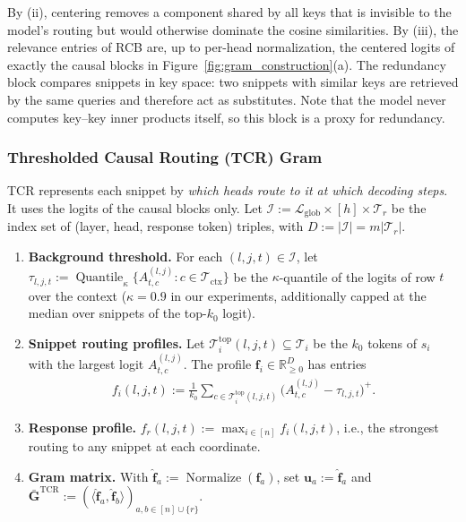 \documentclass{article}
\begin{document}
By (ii), centering removes a component shared by all keys that is invisible to the model's routing but would otherwise dominate the cosine similarities. By (iii), the relevance entries of RCB are, up to per-head normalization, the centered logits of exactly the causal blocks in Figure~\ref{fig:gram_construction}(a). The redundancy block compares snippets in key space: two snippets with similar keys are retrieved by the same queries and therefore act as substitutes. Note that the model never computes key--key inner products itself, so this block is a proxy for redundancy.

\subsubsection{Thresholded Causal Routing (TCR) Gram}
\label{subsubsec:tcr}

TCR represents each snippet by \emph{which heads route to it at which decoding steps}. It uses the logits of the causal blocks only. Let $\mathcal{I} := \mathcal{L}_{\text{glob}} \times [h] \times \mathcal{T}_r$ be the index set of (layer, head, response token) triples, with $D := |\mathcal{I}| = m |\mathcal{T}_r|$.

\begin{enumerate}
    \item \textbf{Background threshold.} For each $(l,j,t) \in \mathcal{I}$, let $\tau_{l,j,t} := \operatorname{Quantile}_\kappa\{A^{(l,j)}_{t,c} : c \in \mathcal{T}_{\text{ctx}}\}$ be the $\kappa$-quantile of the logits of row $t$ over the context ($\kappa = 0.9$ in our experiments, additionally capped at the median over snippets of the top-$k_0$ logit).
    \item \textbf{Snippet routing profiles.} Let $\mathcal{T}_i^{\text{top}}(l,j,t) \subseteq \mathcal{T}_i$ be the $k_0$ tokens of $s_i$ with the largest logit $A^{(l,j)}_{t,c}$. The profile $\mathbf{f}_i \in \mathbb{R}_{\ge 0}^{D}$ has entries
    \begin{align}
        f_i(l,j,t) := \frac{1}{k_0} \sum_{c \in \mathcal{T}_i^{\text{top}}(l,j,t)} \big( A^{(l,j)}_{t,c} - \tau_{l,j,t} \big)^+.
    \end{align}
    \item \textbf{Response profile.} $f_r(l,j,t) := \max_{i \in [n]} f_i(l,j,t)$, i.e., the strongest routing to any snippet at each coordinate.
    \item \textbf{Gram matrix.} With $\hat{\mathbf{f}}_a := \operatorname{Normalize}(\mathbf{f}_a)$, set $\mathbf{u}_a := \hat{\mathbf{f}}_a$ and $\bar{\mathbf{G}}^{\text{TCR}} := (\langle \hat{\mathbf{f}}_a, \hat{\mathbf{f}}_b \rangle)_{a,b \in [n] \cup \{r\}}$.
\end{enumerate}
\end{document}
